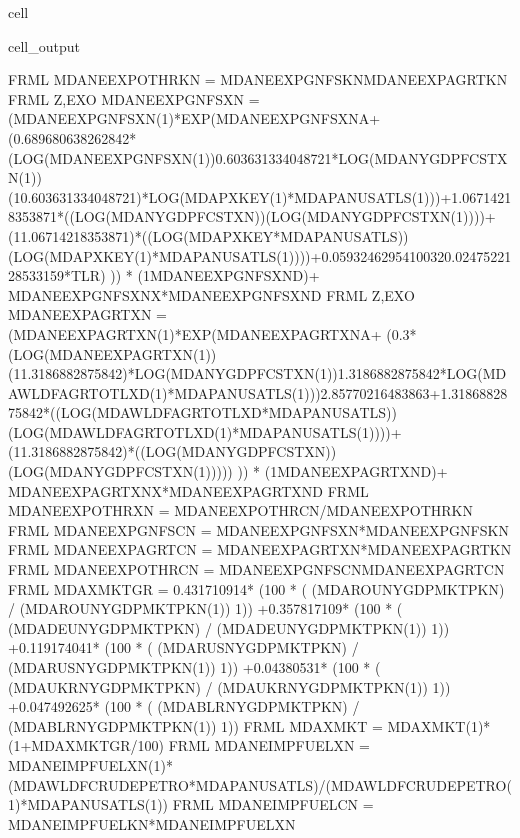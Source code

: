 \documentclass[letterpaper,10pt,english]{jupyterBook}
\begin{document}
\begin{sphinxuseclass}{cell}
\begin{sphinxVerbatimOutput}
\begin{sphinxuseclass}{cell_output}
\begin{sphinxVerbatim}[commandchars=\\\{\}]
FRML  \PYGZlt{}\PYGZgt{} MDANEEXPOTHRKN = MDANEEXPGNFSKN\PYGZhy{}MDANEEXPAGRTKN \PYGZdl{}
FRML \PYGZlt{}Z,EXO\PYGZgt{} MDANEEXPGNFSXN = (MDANEEXPGNFSXN(\PYGZhy{}1)*EXP(MDANEEXPGNFSXN\PYGZus{}A+ (\PYGZhy{}0.689680638262842*(LOG(MDANEEXPGNFSXN(\PYGZhy{}1))\PYGZhy{}0.603631334048721*LOG(MDANYGDPFCSTXN(\PYGZhy{}1))\PYGZhy{}(1\PYGZhy{}0.603631334048721)*LOG(MDAPXKEY(\PYGZhy{}1)*MDAPANUSATLS(\PYGZhy{}1)))+1.06714218353871*((LOG(MDANYGDPFCSTXN))\PYGZhy{}(LOG(MDANYGDPFCSTXN(\PYGZhy{}1))))+(1\PYGZhy{}1.06714218353871)*((LOG(MDAPXKEY*MDAPANUSATLS))\PYGZhy{}(LOG(MDAPXKEY(\PYGZhy{}1)*MDAPANUSATLS(\PYGZhy{}1))))+0.0593246295410032\PYGZhy{}0.0247522128533159*T\PYGZus{}LR) )) * (1\PYGZhy{}MDANEEXPGNFSXN\PYGZus{}D)+ MDANEEXPGNFSXN\PYGZus{}X*MDANEEXPGNFSXN\PYGZus{}D  \PYGZdl{}
FRML \PYGZlt{}Z,EXO\PYGZgt{} MDANEEXPAGRTXN = (MDANEEXPAGRTXN(\PYGZhy{}1)*EXP(MDANEEXPAGRTXN\PYGZus{}A+ (\PYGZhy{}0.3*(LOG(MDANEEXPAGRTXN(\PYGZhy{}1))\PYGZhy{}(1\PYGZhy{}1.3186882875842)*LOG(MDANYGDPFCSTXN(\PYGZhy{}1))\PYGZhy{}1.3186882875842*LOG(MDAWLDFAGRTOTLXD(\PYGZhy{}1)*MDAPANUSATLS(\PYGZhy{}1)))\PYGZhy{}2.85770216483863+1.3186882875842*((LOG(MDAWLDFAGRTOTLXD*MDAPANUSATLS))\PYGZhy{}(LOG(MDAWLDFAGRTOTLXD(\PYGZhy{}1)*MDAPANUSATLS(\PYGZhy{}1))))+(1\PYGZhy{}1.3186882875842)*((LOG(MDANYGDPFCSTXN))\PYGZhy{}(LOG(MDANYGDPFCSTXN(\PYGZhy{}1))))) )) * (1\PYGZhy{}MDANEEXPAGRTXN\PYGZus{}D)+ MDANEEXPAGRTXN\PYGZus{}X*MDANEEXPAGRTXN\PYGZus{}D  \PYGZdl{}
FRML  \PYGZlt{}\PYGZgt{} MDANEEXPOTHRXN = MDANEEXPOTHRCN/MDANEEXPOTHRKN \PYGZdl{}
FRML  \PYGZlt{}\PYGZgt{} MDANEEXPGNFSCN = MDANEEXPGNFSXN*MDANEEXPGNFSKN \PYGZdl{}
FRML  \PYGZlt{}\PYGZgt{} MDANEEXPAGRTCN = MDANEEXPAGRTXN*MDANEEXPAGRTKN \PYGZdl{}
FRML  \PYGZlt{}\PYGZgt{} MDANEEXPOTHRCN = MDANEEXPGNFSCN\PYGZhy{}MDANEEXPAGRTCN \PYGZdl{}
FRML  \PYGZlt{}\PYGZgt{} MDAXMKT\PYGZus{}GR = 0.431710914* (100 * ( (MDAROUNYGDPMKTPKN) / (MDAROUNYGDPMKTPKN(\PYGZhy{}1)) \PYGZhy{}1)) +0.357817109* (100 * ( (MDADEUNYGDPMKTPKN) / (MDADEUNYGDPMKTPKN(\PYGZhy{}1)) \PYGZhy{}1)) +0.119174041* (100 * ( (MDARUSNYGDPMKTPKN) / (MDARUSNYGDPMKTPKN(\PYGZhy{}1)) \PYGZhy{}1)) +0.04380531* (100 * ( (MDAUKRNYGDPMKTPKN) / (MDAUKRNYGDPMKTPKN(\PYGZhy{}1)) \PYGZhy{}1)) +0.047492625* (100 * ( (MDABLRNYGDPMKTPKN) / (MDABLRNYGDPMKTPKN(\PYGZhy{}1)) \PYGZhy{}1)) \PYGZdl{}
FRML  \PYGZlt{}\PYGZgt{} MDAXMKT = MDAXMKT(\PYGZhy{}1)*(1+MDAXMKT\PYGZus{}GR/100) \PYGZdl{}
FRML  \PYGZlt{}\PYGZgt{} MDANEIMPFUELXN = MDANEIMPFUELXN(\PYGZhy{}1)*(MDAWLDFCRUDE\PYGZus{}PETRO*MDAPANUSATLS)/(MDAWLDFCRUDE\PYGZus{}PETRO(\PYGZhy{}1)*MDAPANUSATLS(\PYGZhy{}1)) \PYGZdl{}
FRML  \PYGZlt{}\PYGZgt{} MDANEIMPFUELCN = MDANEIMPFUELKN*MDANEIMPFUELXN \PYGZdl{}

\end{sphinxVerbatim}
\end{sphinxuseclass}
\end{sphinxVerbatimOutput}
\end{sphinxuseclass}
\end{document}
